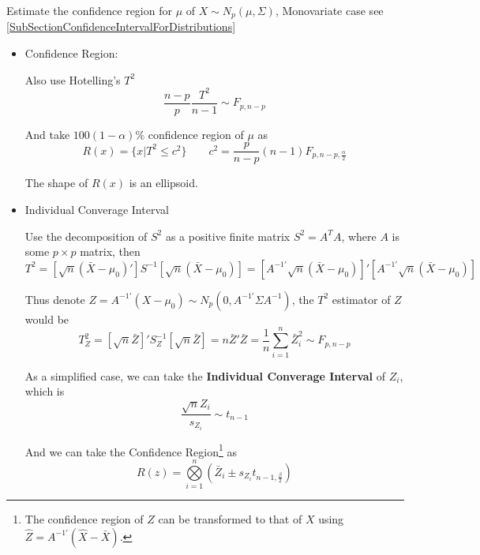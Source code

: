     Estimate the confidence region for $ \mu $ of $ X\sim N_p(\mu,\Sigma ) $, Monovariate case see \autoref{SubSectionConfidenceIntervalForDistributions}
\begin{itemize}
    \item Confidence Region:

    Also use Hotelling's $ T^2 $
    \begin{equation}
         \dfrac{n-p}{p}\dfrac{T^2}{n-1}\sim F_{p,n-p}
    \end{equation}
    
    And take $ 100(1-\alpha )\% $ confidence region of $ \mu $ as
    \begin{equation}
        R(x)=\{x|T^2\leq c^2\}\qquad c^2=\dfrac{p}{n-p}(n-1)F_{p,n-p,\frac{\alpha }{2}} 
    \end{equation}

    The shape of $ R(x) $ is an ellipsoid.
    


    \item Individual Converage Interval
    
    Use the decomposition of $ S^2 $ as a positive finite matrix $ S^2=A^TA $, where $ A $ is some $ p\times p $ matrix, then
    \begin{equation}
        T^2= [\sqrt{n}(\bar{X}-\mu_0)']S^{-1}[\sqrt{n}(\bar{X}-\mu _0)]=[A^{-1\prime}\sqrt{n}(\bar{X}-\mu_0)]'[A^{-1\prime}\sqrt{n}(\bar{X}-\mu_0)]
    \end{equation}

    Thus denote $ Z=A^{-1\prime}(X-\mu_0) \sim N_p(0,A^{-1\prime}\Sigma A^{-1}) $, the $ T^2 $ estimator of $ Z $ would be
    \begin{equation}
        T_Z^2=[\sqrt{n}\bar{Z}]'S^{-1}_Z [\sqrt{n}\bar{Z}]=n\bar{Z}'\bar{Z}=\dfrac{1}{n}\sum_{i=1}^n\bar{Z}_i^2\sim F_{p,n-p}
    \end{equation}

    As a simplified case, we can take the \textbf{Individual Converage Interval} of $ Z_i $, which is 
    \begin{equation}
        \dfrac{\sqrt{n}Z_i}{s_{Z_i}}\sim t_{n-1} 
    \end{equation}
    
    And we can take the Confidence Region\footnote{The confidence region of $ Z $ can be transformed to that of $ X $ using $ \hat{Z}=A^{-1\prime}(\hat{X}-\bar{X}) $. } as
    \begin{equation}\label{EqaConfidenceRegionUsingBonferroni}
        R(z)= \bigotimes\limits_{i=1}^n(\bar{Z}_i\pm s_{Z_i}t_{n-1,\frac{\beta }{2}})
    \end{equation}
    

\end{itemize}
